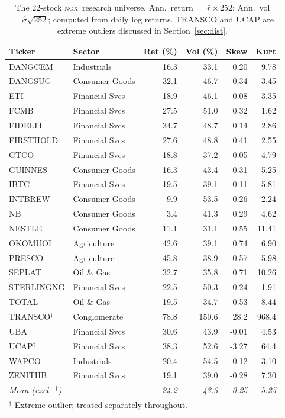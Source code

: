 \documentclass[twoside,11pt]{article}
\newcommand{\ngx}{\textsc{ngx}}
\begin{document}
	\begin{table}[ht]
		\centering
		\caption{The 22-stock \ngx\ research universe. Ann.\ return
			$= \bar{r} \times 252$; Ann.\ vol $= \hat{\sigma}\sqrt{252}$;
			computed from daily log returns. TRANSCO and UCAP are extreme
			outliers discussed in Section~\ref{sec:dist}.}
		\label{tab:universe}
		\small
		\setlength{\tabcolsep}{5pt}
		\begin{tabular}{llrrrr}
			\toprule
			\textbf{Ticker} & \textbf{Sector} &
			\textbf{Ret (\%)} & \textbf{Vol (\%)} &
			\textbf{Skew} & \textbf{Kurt}\\
			\midrule
			DANGCEM   & Industrials     & 16.3 & 33.1 &  0.20 &  9.78 \\
			DANGSUG   & Consumer Goods  & 32.1 & 46.7 &  0.34 &  3.45 \\
			ETI       & Financial Svcs  & 18.9 & 46.1 &  0.08 &  3.35 \\
			FCMB      & Financial Svcs  & 27.5 & 51.0 &  0.32 &  1.62 \\
			FIDELIT   & Financial Svcs  & 34.7 & 48.7 &  0.14 &  2.86 \\
			FIRSTHOLD & Financial Svcs  & 27.6 & 48.8 &  0.41 &  2.55 \\
			GTCO      & Financial Svcs  & 18.8 & 37.2 &  0.05 &  4.79 \\
			GUINNES   & Consumer Goods  & 16.3 & 43.4 &  0.31 &  5.25 \\
			IBTC      & Financial Svcs  & 19.5 & 39.1 &  0.11 &  5.81 \\
			INTBREW   & Consumer Goods  &  9.9 & 53.5 &  0.26 &  2.24 \\
			NB        & Consumer Goods  &  3.4 & 41.3 &  0.29 &  4.62 \\
			NESTLE    & Consumer Goods  & 11.1 & 31.1 &  0.55 & 11.41 \\
			OKOMUOI   & Agriculture     & 42.6 & 39.1 &  0.74 &  6.90 \\
			PRESCO    & Agriculture     & 45.8 & 38.9 &  0.57 &  5.98 \\
			SEPLAT    & Oil \& Gas      & 32.7 & 35.8 &  0.71 & 10.26 \\
			STERLINGNG& Financial Svcs  & 22.5 & 50.3 &  0.24 &  1.91 \\
			TOTAL     & Oil \& Gas      & 19.5 & 34.7 &  0.53 &  8.44 \\
			TRANSCO$^\dagger$ & Conglomerate & 78.8 & 150.6 & 28.2 & 968.4\\
			UBA       & Financial Svcs  & 30.6 & 43.9 & -0.01 &  4.53 \\
			UCAP$^\dagger$    & Financial Svcs  & 38.3 & 52.6 & -3.27 & 64.4\\
			WAPCO     & Industrials     & 20.4 & 54.5 &  0.12 &  3.10 \\
			ZENITHB   & Financial Svcs  & 19.1 & 39.0 & -0.28 &  7.30 \\
			\midrule
			\textit{Mean (excl.\ $^\dagger$)} & &
			\textit{24.2} & \textit{43.3} &
			\textit{0.25} & \textit{5.25}\\
			\bottomrule
			\multicolumn{6}{l}{$^\dagger$ Extreme outlier; treated separately throughout.}
		\end{tabular}
	\end{table}
	
\end{document}
